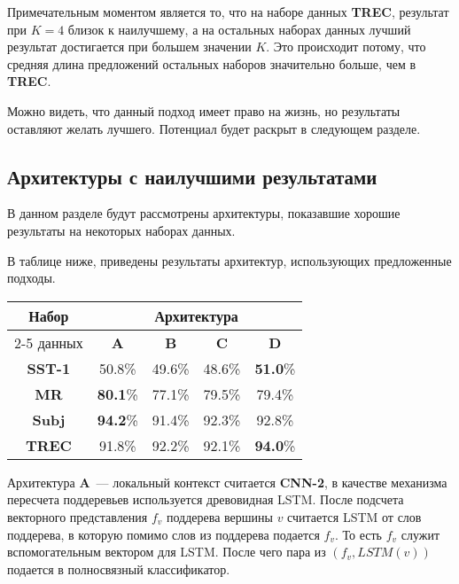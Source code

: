 Примечательным моментом является то, что на наборе данных \textbf{TREC}, результат при $K=4$ близок к наилучшему, а на остальных наборах данных лучший результат достигается при большем значении $K$.
Это происходит потому, что средняя длина предложений остальных наборов значительно больше, чем в \textbf{TREC}.

Можно видеть, что данный подход имеет право на жизнь, но результаты оставляют желать лучшего.
Потенциал  будет раскрыт в следующем разделе.

\subsection{Архитектуры с наилучшими результатами}

В данном разделе будут рассмотрены архитектуры, показавшие хорошие результаты на некоторых наборах данных.

В таблице ниже, приведены результаты архитектур, использующих предложенные подходы.

\vspace{5mm}
\begin{minipage}{\linewidth}
 \label{tab:title} 
\begin{tabular}{|c|c|c|c|c|}
\hline
\multirow{2}{*}{Набор}   &             \multicolumn{4}{c|}{Архитектура} \\ \cline{2-5} 
     данных              & \textbf{A}  & \textbf{B} & \textbf{C} & \textbf{D} \\ \hline
\textbf{SST-1}           & 50.8\%       & 49.6\%     & 48.6\%     & \textbf{51.0}\%     \\ \hline
\textbf{MR}              & \textbf{80.1}\%       & 77.1\%     & 79.5\%     & 79.4\%     \\ \hline
\textbf{Subj}            & \textbf{94.2}\%       & 91.4\%     & 92.3\%     & 92.8\%     \\ \hline
\textbf{TREC}            & 91.8\%       & 92.2\%     & 92.1\%     & \textbf{94.0}\%     \\ \hline
\end{tabular}
\end{minipage}
\vspace{5mm}

Архитектура \textbf{A}~--- локальный контекст считается \textbf{CNN-2}, в качестве механизма пересчета поддеревьев используется древовидная LSTM. После подсчета векторного представления $f_v$ поддерева вершины $v$ считается LSTM от слов поддерева, в которую помимо слов из поддерева подается $f_v$. То есть $f_v$ служит вспомогательным вектором для
LSTM. После чего пара из $(f_v, LSTM(v))$ подается в полносвязный классификатор.

